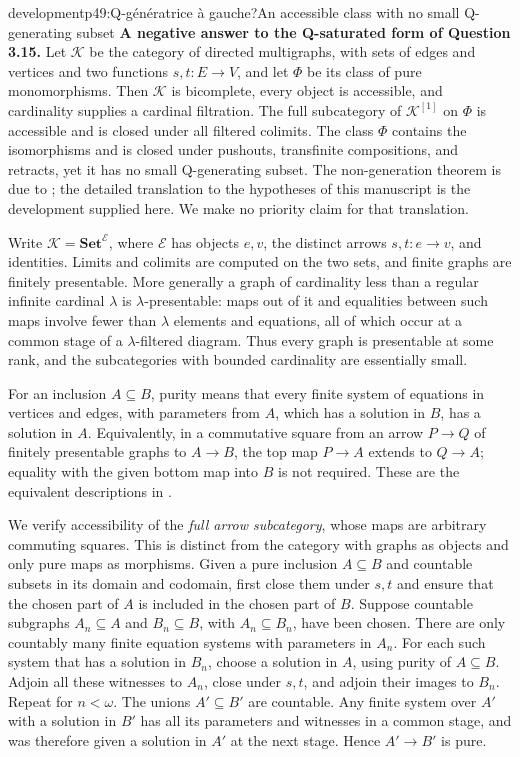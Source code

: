 \begin{dcomment}{development}{p49:Q-génératrice à gauche?}{An accessible class with no small Q-generating subset}
\textbf{A negative answer to the Q-saturated form of Question 3.15.}\ours
Let $\mathcal K$ be the category of directed multigraphs, with sets of edges and vertices and two functions $s,t:E\to V$, and let $\Phi$ be its class of pure monomorphisms. Then $\mathcal K$ is bicomplete, every object is accessible, and cardinality supplies a cardinal filtration. The full subcategory of $\mathcal K^{[1]}$ on $\Phi$ is accessible and is closed under all filtered colimits. The class $\Phi$ contains the isomorphisms and is closed under pushouts, transfinite compositions, and retracts, yet it has no small Q-generating subset. The non-generation theorem is due to \citet[Theorem~5.1]{CoxEtAl2026Pure}; the detailed translation to the hypotheses of this manuscript is the development supplied here. We make no priority claim for that translation.

Write $\mathcal K=\mathbf{Set}^{\mathcal E}$, where $\mathcal E$ has objects $e,v$, the distinct arrows $s,t:e\to v$, and identities. Limits and colimits are computed on the two sets, and finite graphs are finitely presentable. More generally a graph of cardinality less than a regular infinite cardinal $\lambda$ is $\lambda$-presentable: maps out of it and equalities between such maps involve fewer than $\lambda$ elements and equations, all of which occur at a common stage of a $\lambda$-filtered diagram. Thus every graph is presentable at some rank, and the subcategories with bounded cardinality are essentially small.

For an inclusion $A\subseteq B$, purity means that every finite system of equations in vertices and edges, with parameters from $A$, which has a solution in $B$, has a solution in $A$. Equivalently, in a commutative square from an arrow $P\to Q$ of finitely presentable graphs to $A\to B$, the top map $P\to A$ extends to $Q\to A$; equality with the given bottom map into $B$ is not required. These are the equivalent descriptions in \citet[Definition~2.7 and Remark~2.8]{CoxEtAl2026Pure}.

We verify accessibility of the \emph{full arrow subcategory}, whose maps are arbitrary commuting squares. This is distinct from the category with graphs as objects and only pure maps as morphisms. Given a pure inclusion $A\subseteq B$ and countable subsets in its domain and codomain, first close them under $s,t$ and ensure that the chosen part of $A$ is included in the chosen part of $B$. Suppose countable subgraphs $A_n\subseteq A$ and $B_n\subseteq B$, with $A_n\subseteq B_n$, have been chosen. There are only countably many finite equation systems with parameters in $A_n$. For each such system that has a solution in $B_n$, choose a solution in $A$, using purity of $A\subseteq B$. Adjoin all these witnesses to $A_n$, close under $s,t$, and adjoin their images to $B_n$. Repeat for $n<\omega$. The unions $A'\subseteq B'$ are countable. Any finite system over $A'$ with a solution in $B'$ has all its parameters and witnesses in a common stage, and was therefore given a solution in $A'$ at the next stage. Hence $A'\to B'$ is pure.


\end{dcomment}
